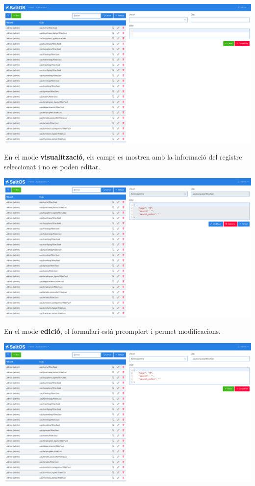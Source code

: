 \documentclass[a4paper]{article}
\begin{document}
\begin{center}\includegraphics[width=1\textwidth]{../ujest/snaps/test-screenshots-js-screenshots-common-configlog-create-ca-es-1-snap.png}\end{center}

En el mode \textbf{visualització}, els camps es mostren amb la informació del registre seleccionat i no es poden editar.

\begin{center}\includegraphics[width=1\textwidth]{../ujest/snaps/test-screenshots-js-screenshots-common-configlog-view-10-ca-es-1-snap.png}\end{center}

En el mode \textbf{edició}, el formulari està preomplert i permet modificacions.

\begin{center}\includegraphics[width=1\textwidth]{../ujest/snaps/test-screenshots-js-screenshots-common-configlog-edit-10-ca-es-1-snap.png}\end{center}
\end{document}
